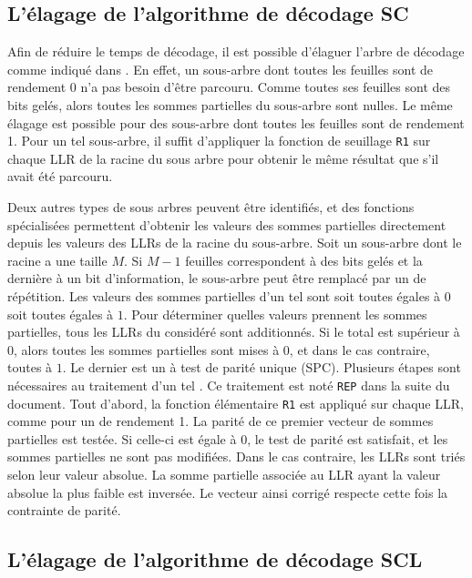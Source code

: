 
\subsection{L'élagage de l'algorithme de décodage SC}
Afin de réduire le temps de décodage, il est possible d'élaguer l'arbre de décodage comme indiqué dans \cite{alamdar-yazdi_simplified_2011}. En effet, un sous-arbre dont toutes les feuilles sont de rendement 0 n'a pas besoin d'être parcouru. Comme toutes ses feuilles sont des bits gelés, alors toutes les sommes partielles du sous-arbre sont nulles. Le même élagage est possible pour des sous-arbre dont toutes les feuilles sont de rendement 1. Pour un tel sous-arbre, il suffit d'appliquer la fonction de seuillage \texttt{R1} sur chaque LLR de la racine du sous arbre pour obtenir le même résultat que s'il avait été parcouru.

Deux autres types de sous arbres peuvent être identifiés, et des fonctions spécialisées permettent d'obtenir les valeurs des sommes partielles directement depuis les valeurs des LLRs de la racine du sous-arbre. Soit un sous-arbre dont le \noeud racine a une taille $M$. Si $M-1$ feuilles correspondent à des bits gelés et la dernière à un bit d'information, le sous-arbre peut être remplacé par un \noeud de répétition. Les valeurs des sommes partielles d'un tel \noeud sont soit toutes égales à $0$ soit toutes égales à $1$. Pour déterminer quelles valeurs prennent les sommes partielles, tous les LLRs du \noeud considéré sont additionnés. Si le total est supérieur à 0, alors toutes les sommes partielles sont mises à $0$, et dans le cas contraire, toutes à $1$. Le dernier est un \noeud à test de parité unique (SPC). Plusieurs étapes sont nécessaires au traitement d'un tel \noeud. Ce traitement est noté \texttt{REP} dans la suite du document. Tout d'abord, la fonction élémentaire \texttt{R1} est appliqué sur chaque LLR, comme pour un \noeud de rendement 1. La parité de ce premier vecteur de sommes partielles est testée. Si celle-ci est égale à 0, le test de parité est satisfait, et les sommes partielles ne sont pas modifiées. Dans le cas contraire, les LLRs sont triés selon leur valeur absolue. La somme partielle associée au LLR ayant la valeur absolue la plus faible est inversée. Le vecteur ainsi corrigé respecte cette fois la contrainte de parité.

\subsection{L'élagage de l'algorithme de décodage SCL}

